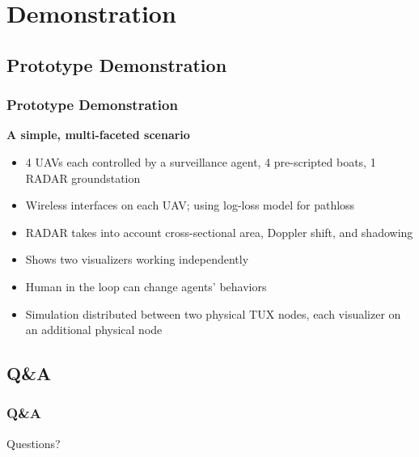 \documentclass[mathserif]{beamer}
\begin{document}
\section{Demonstration}
\subsection{Prototype Demonstration}
\frame
{
    \frametitle{Prototype Demonstration}
    \textbf{A simple, multi-faceted scenario}
    \begin{itemize}
        \item 4 UAVs each controlled by a surveillance agent, 4 pre-scripted boats, 1 RADAR groundstation
        \item Wireless interfaces on each UAV; using log-loss model for pathloss
        \item RADAR takes into account cross-sectional area, Doppler shift, and shadowing
        \item Shows two visualizers working independently
        \item Human in the loop can change agents' behaviors
        \item Simulation distributed between two physical TUX nodes, each visualizer on an additional physical node
    \end{itemize}
}

\subsection{Q\&A}
\frame
{
    \frametitle{Q\&A}
    \begin{center} 
        \Huge Questions? 
    \end{center}
}
\end{document}
